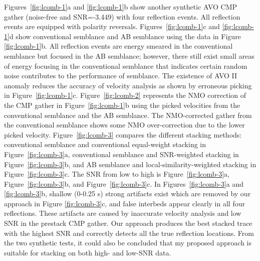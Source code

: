 Figures~\ref{fig:lcomb-1}a and \ref{fig:lcomb-1}b show another synthetic AVO CMP gather (noise-free and SNR=-3.449) with four reflection events. All reflection events are equipped with polarity reversals. 
Figures~\ref{fig:lcomb-1}c and \ref{fig:lcomb-1}d show
conventional semblance and AB semblance using the data in Figure \ref{fig:lcomb-1}b. All reflection events are energy smeared in the conventional semblance but focused in the AB semblance; however,
there still exist small areas of energy focusing in the conventional semblance that indicates certain random noise contributes to the performance of semblance. The existence of AVO II anomaly reduces the accuracy of velocity analysis as shown by erroneous picking in Figure~\ref{fig:lcomb-1}c. 
Figure~\ref{fig:lcomb-2} represents the NMO correction of the CMP gather in Figure~\ref{fig:lcomb-1}b
using the picked velocities from the conventional semblance and the AB semblance. The NMO-corrected gather from the conventional semblance shows some NMO over-correction due to the lower picked velocity.
Figure~\ref{fig:lcomb-3} compares the different stacking methods: conventional semblance and conventional 
equal-weight stacking in Figure~\ref{fig:lcomb-3}a, conventional semblance and SNR-weighted stacking in Figure~\ref{fig:lcomb-3}b, and 
AB semblance and local-similarity-weighted stacking in Figure~\ref{fig:lcomb-3}c. The SNR from low to high is Figure~\ref{fig:lcomb-3}a, Figure~\ref{fig:lcomb-3}b, and Figure~\ref{fig:lcomb-3}c. 
In Figures~\ref{fig:lcomb-3}a and \ref{fig:lcomb-3}b, shallow (0-0.25 s) strong artifacts exist which are removed by our approach in Figure \ref{fig:lcomb-3}c, and false interbeds appear clearly in all four reflections. These artifacts are caused by inaccurate velocity analysis and low SNR in the prestack CMP gather. Our approach produces the best stacked trace with the highest SNR and correctly detects all the true reflection locations. From the two synthetic tests, it could also be concluded that my proposed approach is suitable for stacking on both high- and low-SNR data.

  
